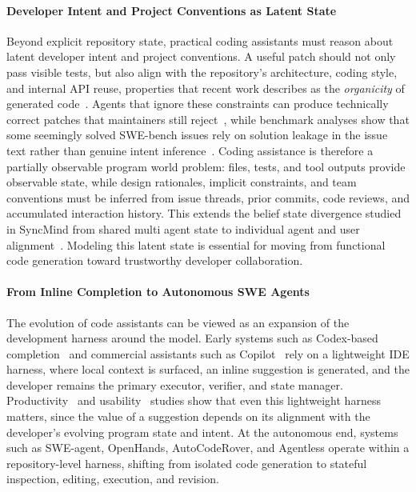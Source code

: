 \documentclass{llmxive}
\begin{document}
\paragraph{Developer Intent and Project Conventions as Latent State}
Beyond explicit repository state, practical coding assistants must reason about
latent developer intent and project conventions. A useful patch should not only
pass visible tests, but also align with the repository's architecture, coding
style, and internal API reuse, properties that recent work describes as the
\emph{organicity} of generated code~\cite{li2026learning}. Agents that ignore
these constraints can produce technically correct patches that maintainers still
reject~\cite{li2026learning,thillen2026codetaste}, while benchmark analyses show
that some seemingly solved SWE-bench issues rely on solution leakage in the
issue text rather than genuine intent inference~\cite{aleithan2024swe}. Coding
assistance is therefore a partially observable program world problem: files,
tests, and tool outputs provide observable state, while design rationales,
implicit constraints, and team conventions must be inferred from issue threads,
prior commits, code reviews, and accumulated interaction history. This extends
the belief state divergence studied in SyncMind from shared multi agent state to
individual agent and user alignment~\cite{Guo2025SyncMind}. Modeling this latent
state is essential for moving from functional code generation toward trustworthy
developer collaboration.

\paragraph{From Inline Completion to Autonomous SWE Agents}
The evolution of code assistants can be viewed as an expansion of the development harness around the model.
Early systems such as Codex-based completion~\cite{chen2021evaluating} and commercial assistants such as Copilot~\cite{peng2023copilot} rely on a lightweight IDE harness, where local context is surfaced, an inline suggestion is generated, and the developer remains the primary executor, verifier, and state manager.
Productivity~\cite{peng2023copilot} and usability~\cite{vaithilingam2022expectation,mozannar2022reading} studies show that even this lightweight harness matters, since the value of a suggestion depends on its alignment with the developer's evolving program state and intent.
At the autonomous end, systems such as SWE-agent, OpenHands, AutoCodeRover, and Agentless operate within a repository-level harness, shifting from isolated code generation to stateful inspection, editing, execution, and revision.
\end{document}
